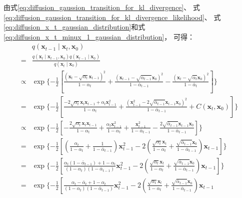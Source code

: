 由式{\ref{eq:diffusion_gaussion_transition_for_kl_divergence}}、
式{\ref{eq:diffusion_gaussion_transition_for_kl_divergence_likelihood}}、
式{\ref{eq:diffusion_x_t_gaussian_distribution}}和式{\ref{eq:diffusion_x_t_minux_1_gaussian_distribution}}，
可得：
\begin{align}
    &q(\bm{x}_{t-1}\mid \bm{x}_{t},\bm{x}_0)
    \\ = &\frac{q(\bm{x}_{t}\mid \bm{x}_{t-1},\bm{x}_0) q(\bm{x}_{t-1}\mid \bm{x}_0)}{q(\bm{x}_{t}\mid \bm{x}_0) }
    \\  \propto & \exp \{ -\frac{1}{2}  \left[   \frac{{(\bm{x}_{t}-\sqrt{\alpha_{t}}\bm{x}_{t-1})}^{2}}{1-\alpha_{t}}
    +  \frac{{(\bm{x}_{t-1}-\sqrt{\bar{\alpha}_{t-1}}\bm{x}_{0})}^{2}}{1-\bar{\alpha}_{t-1}}
    - \frac{{(\bm{x}_{t}-\sqrt{\bar{\alpha}_{t}}\bm{x}_{0})}^{2}}{1-\bar{\alpha}_{t}}
     \right]  \}
    \\ = & \exp \{ -\frac{1}{2}  \left[ 
    \frac{-2 \sqrt{\alpha_{t}}\bm{x}_{t}\bm{x}_{t-1}+\alpha_{t}\bm{x}_{t-1}^{2}}{1-\alpha_{t}}
     +  \frac{{(\bm{x}_{t-1}^{2} -2\sqrt{\bar{\alpha}_{t-1}}\bm{x}_{t-1}\bm{x}_{0})}^{2}}{1-\bar{\alpha}_{t-1}}
     + C(\bm{x}_{t},\bm{x}_{0})
        \right]  \} \label{eq:diffusion_kl_divergence_q_with_c}
    \\  \propto & \exp \{ -\frac{1}{2}  \left[ 
        -\frac{2 \sqrt{\alpha_{t}}\bm{x}_{t}\bm{x}_{t-1}}{1-\alpha_{t}}
        +\frac{\alpha_{t}\bm{x}_{t-1}^{2}}{1-\alpha_{t}}
        + \frac{\bm{x}_{t-1}^{2} }{1-\bar{\alpha}_{t-1}}
        - \frac{2\sqrt{\bar{\alpha}_{t-1}}\bm{x}_{t-1}\bm{x}_{0}}{1-\bar{\alpha}_{t-1}}
         \right]  \}
    \\ = & \exp \{ -\frac{1}{2}  \left[ 
    \left(\frac{\alpha_{t}}{1-\alpha_{t}}+ \frac{1}{1-\bar{\alpha}_{t-1}}\right) \bm{x}_{t-1}^{2}
    -2\left(\frac{\sqrt{\alpha_{t}}\bm{x}_{t}}{1-\alpha_{t}}  + \frac{\sqrt{\bar{\alpha}_{t-1}}\bm{x}_{0}}{1-\bar{\alpha}_{t-1}}  \right)\bm{x}_{t-1}
        \right]  \}
    \\ = & \exp \{ -\frac{1}{2}  \left[ 
    \frac{\alpha_{t}(1-\bar{\alpha}_{t-1})+1-\alpha_{t}}{(1-\alpha_{t})(1-\bar{\alpha}_{t-1})} \bm{x}_{t-1}^{2}
    -2\left(\frac{\sqrt{\alpha_{t}}\bm{x}_{t}}{1-\alpha_{t}}  + \frac{\sqrt{\bar{\alpha}_{t-1}}\bm{x}_{0}}{1-\bar{\alpha}_{t-1}}  \right)\bm{x}_{t-1}
        \right]  \}
    \\ = & \exp \{ -\frac{1}{2}  \left[ 
    \frac{\alpha_{t}-\bar{\alpha}_{t}+1-\alpha_{t}}{(1-\alpha_{t})(1-\bar{\alpha}_{t-1})} \bm{x}_{t-1}^{2}
    -2\left(\frac{\sqrt{\alpha_{t}}\bm{x}_{t}}{1-\alpha_{t}}  + \frac{\sqrt{\bar{\alpha}_{t-1}}\bm{x}_{0}}{1-\bar{\alpha}_{t-1}}  \right)\bm{x}_{t-1}

\end{align}
